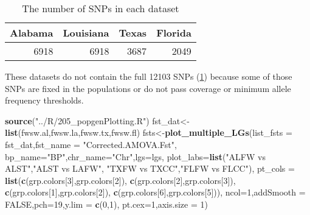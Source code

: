 \documentclass[11pt,]{article}
\newenvironment{Shaded}{\begin{snugshade}}{\end{snugshade}}
\newcommand{\KeywordTok}[1]{\textcolor[rgb]{0.13,0.29,0.53}{\textbf{#1}}}
\newcommand{\DataTypeTok}[1]{\textcolor[rgb]{0.13,0.29,0.53}{#1}}
\newcommand{\DecValTok}[1]{\textcolor[rgb]{0.00,0.00,0.81}{#1}}
\newcommand{\StringTok}[1]{\textcolor[rgb]{0.31,0.60,0.02}{#1}}
\newcommand{\OtherTok}[1]{\textcolor[rgb]{0.56,0.35,0.01}{#1}}
\newcommand{\NormalTok}[1]{#1}
\begin{document}
\begin{table}

\caption{\label{tab:readStacksFsts}The number of SNPs in each dataset}
\centering
\begin{tabular}[t]{r|r|r|r}
\hline
Alabama & Louisiana & Texas & Florida\\
\hline
6918 & 6918 & 3687 & 2049\\
\hline
\end{tabular}
\end{table}

These datasets do not contain the full 12103 SNPs
(\ref{tab:readStacksFsts}) because some of those SNPs are fixed in the
populations or do not pass coverage or minimum allele frequency
thresholds.

\begin{Shaded}
\begin{Highlighting}[]
\KeywordTok{source}\NormalTok{(}\StringTok{"../R/205_popgenPlotting.R"}\NormalTok{)}
\NormalTok{fst_dat<-}\KeywordTok{list}\NormalTok{(fwsw.al,fwsw.la,fwsw.tx,fwsw.fl)}
\NormalTok{fsts<-}\KeywordTok{plot_multiple_LGs}\NormalTok{(}\DataTypeTok{list_fsts =}\NormalTok{ fst_dat,}\DataTypeTok{fst_name =} \StringTok{"Corrected.AMOVA.Fst"}\NormalTok{,}
                        \DataTypeTok{bp_name=}\StringTok{"BP"}\NormalTok{,}\DataTypeTok{chr_name=}\StringTok{"Chr"}\NormalTok{,}\DataTypeTok{lgs=}\NormalTok{lgs,}
                        \DataTypeTok{plot_labs=}\KeywordTok{list}\NormalTok{(}\StringTok{"ALFW vs ALST"}\NormalTok{,}\StringTok{"ALST vs LAFW"}\NormalTok{,}
                                       \StringTok{"TXFW vs TXCC"}\NormalTok{,}\StringTok{"FLFW vs FLCC"}\NormalTok{),}
                        \DataTypeTok{pt_cols =} \KeywordTok{list}\NormalTok{(}\KeywordTok{c}\NormalTok{(grp.colors[}\DecValTok{3}\NormalTok{],grp.colors[}\DecValTok{2}\NormalTok{]),}
                                       \KeywordTok{c}\NormalTok{(grp.colors[}\DecValTok{2}\NormalTok{],grp.colors[}\DecValTok{3}\NormalTok{]),}
                                       \KeywordTok{c}\NormalTok{(grp.colors[}\DecValTok{1}\NormalTok{],grp.colors[}\DecValTok{2}\NormalTok{]),}
                                       \KeywordTok{c}\NormalTok{(grp.colors[}\DecValTok{6}\NormalTok{],grp.colors[}\DecValTok{5}\NormalTok{])),}
                        \DataTypeTok{ncol=}\DecValTok{1}\NormalTok{,}\DataTypeTok{addSmooth =} \OtherTok{FALSE}\NormalTok{,}\DataTypeTok{pch=}\DecValTok{19}\NormalTok{,}\DataTypeTok{y.lim =} \KeywordTok{c}\NormalTok{(}\DecValTok{0}\NormalTok{,}\DecValTok{1}\NormalTok{),}
                        \DataTypeTok{pt.cex=}\DecValTok{1}\NormalTok{,}\DataTypeTok{axis.size =} \DecValTok{1}\NormalTok{)}
\end{Highlighting}
\end{Shaded}
\end{document}
